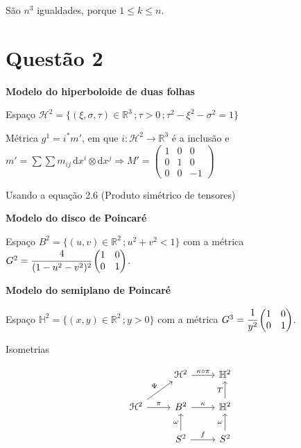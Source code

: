 \documentclass[10pt,a4paper]{article}
\begin{document}
		S\~ao $n^3$ igualdades, porque $1 \le k \le n$.

		\vspace{12mm}

	\section{Quest\~ao 2}
		\begin{flushright}
		\end{flushright}

		\textbf{Modelo do hiperboloide de duas folhas}

		Espa\c{c}o $\mathcal{H}^2 = \{ (\xi, \sigma, \tau) \in \mathbb{R}^3 \,; \tau > 0 \,; \tau^2 - \xi^2 - \sigma^2 = 1 \}$

		M\'etrica $g^1 = i^* m'$, em que $i : \mathcal{H}^2 \rightarrow \mathbb{R}^3$ \'e a inclus\~ao e	$m' = \sum \sum m_{ij}\, \mathrm{d}x^i \otimes \mathrm{d}x^j \Rightarrow M' = \left( \begin{matrix} 1 & 0 & 0 \\ 0 & 1 & 0 \\ 0 & 0 & -1 \end{matrix} \right)$

		Usando a equa\c{c}\~ao 2.6 (Produto sim\'etrico de tensores)

		\vspace{6mm}

		\textbf{Modelo do disco de Poincar\'e}

		Espa\c{c}o $B^2 = \{ (u, v) \in \mathbb{R}^2 \,; u^2 + v^2 < 1 \}$ com a m\'etrica $G^2 = \cfrac{4}{(1 - u^2 - v^2)^2} \left( \begin{matrix} 1 & 0 \\ 0 & 1 \end{matrix} \right)$.

		\vspace{6mm}

		\textbf{Modelo do semiplano de Poincar\'e}

		Espa\c{c}o $\mathbb{H}^2 = \{ (x,y) \in \mathbb{R}^2 \,; y > 0 \}$ com a m\'etrica $G^3 = \cfrac{1}{y^2} \left( \begin{matrix} 1 & 0 \\ 0 & 1 \end{matrix} \right)$.

		\vspace{6mm}

		Isometrias

		\[
		\begin{tikzcd}
		                                              & \mathcal{H}^2 \arrow{r}{\kappa \circ \pi} & \mathbb{H}^2  \\
		\mathcal{H}^2 \arrow{ur}{\Psi} \arrow{r}{\pi} & B^2 \arrow{r}{\kappa}                     & \mathbb{H}^2 \arrow{u}{T}  \\
		                                              & S^2 \arrow{r}{f} \arrow{u}{\omega}        & S^2 \arrow{u}{\omega}
		\end{tikzcd}
		\]
\end{document}
